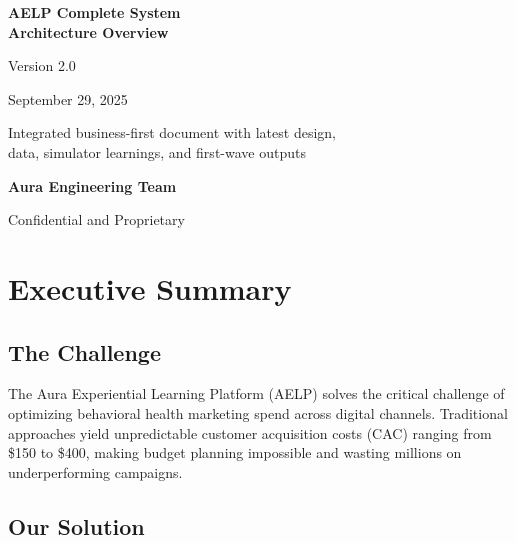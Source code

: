 \documentclass[11pt,a4paper]{report}
\begin{document}
\begin{titlepage}
    \centering
    \vspace*{2cm}

    {\Huge\bfseries\color{aelpblue} AELP Complete System\\Architecture Overview\par}
    \vspace{1cm}
    {\Large Version 2.0\par}
    \vspace{0.5cm}
    {\large September 29, 2025\par}

    \vspace{2cm}

    \begin{tcolorbox}[colback=aelplightgray,colframe=aelpblue,width=0.8\textwidth]
        \centering
        Integrated business-first document with latest design,\\
        data, simulator learnings, and first-wave outputs
    \end{tcolorbox}

    \vfill

    {\large\textbf{Aura Engineering Team}\par}
    \vspace{1cm}
    {\small Confidential and Proprietary\par}
\end{titlepage}

\tableofcontents
\newpage

\chapter{Executive Summary}

\section{The Challenge}

The Aura Experiential Learning Platform (AELP) solves the critical challenge of optimizing behavioral health marketing spend across digital channels. Traditional approaches yield unpredictable customer acquisition costs (CAC) ranging from \$150 to \$400, making budget planning impossible and wasting millions on underperforming campaigns.

\section{Our Solution}
\end{document}
